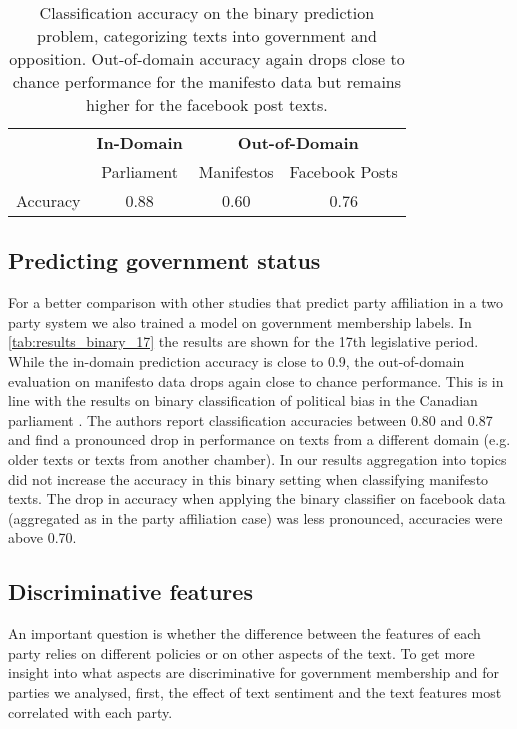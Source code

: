 \documentclass[11pt]{article}
\begin{document}
\begin{table*}[t]
\caption{
\label{tab:results_binary_17}
Classification accuracy on the binary prediction problem, categorizing texts into government and opposition. Out-of-domain accuracy again drops close to chance performance for the manifesto data but remains higher for the facebook post texts. 
}
\begin{center}
\begin{tabular}{lccc}
& {\bf In-Domain} & \multicolumn{2}{c}{{\bf Out-of-Domain}}\\
& Parliament & Manifestos & Facebook Posts\\
\hline
Accuracy    &   0.88   &   0.60&      0.76\\
%
\end{tabular}
\end{center}
\end{table*}

\subsection{Predicting government status}\label{sec:sentiment_result}
For a better comparison with other studies that predict party affiliation in a two party system we also trained a model on government membership labels. In \autoref{tab:results_binary_17} the results are shown for the 17th legislative period. While the in-domain prediction accuracy is close to 0.9, the out-of-domain evaluation on manifesto data drops again close to chance performance. This is in line with the results on binary classification of political bias in the Canadian parliament \cite{Yu2008}. The authors report classification accuracies between 0.80 and 0.87 and find a pronounced drop in performance on texts from a different domain (e.g. older texts or texts from another chamber). In our results aggregation into topics did not increase the accuracy in this binary setting when classifying manifesto texts. The drop in accuracy when applying the binary classifier on facebook data (aggregated as in the party affiliation case) was less pronounced, accuracies were above 0.70. 

\subsection{Discriminative features}
\label{sec:discrim_effect}
An important question is whether the difference between the features of each party relies on different policies or on other aspects of the text. To get more insight into what aspects are discriminative for government membership and for parties we analysed, first, the effect of text sentiment and the text features most correlated with each party.
\end{document}
